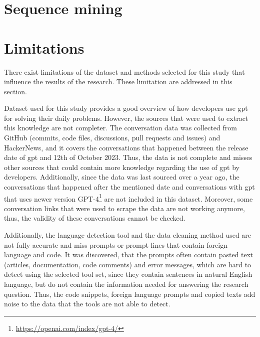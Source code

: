 \section{Sequence mining}

\section{Limitations}
There exist limitations of the dataset and methods selected for this study that influence the results of the research. These limitation are addressed in this section. 

Dataset used for this study provides a good overview of how developers use \acrshort{gpt} for solving their daily problems. However, the sources that were used to extract this knowledge are not completer. The conversation data was collected from GitHub (commits, code files, discussions, pull requests and issues) and HackerNews, and it covers the conversations that happened between the release date of \acrshort{gpt} and 12th of October 2023. Thus, the data is not complete and misses other sources that could contain more knowledge regarding the use of \acrshort{gpt} by developers. Additionally, since the data was last sourced over a year ago, the conversations that happened after the mentioned date and conversations with \acrshort{gpt} that uses newer version GPT-4\footnote{\url{https://openai.com/index/gpt-4/}} are not included in this dataset. Moreover, some conversation links that were used to scrape the data are not working anymore, thus, the validity of these conversations cannot be checked.

Additionally, the language detection tool and the data cleaning method used are not fully accurate and miss prompts or prompt lines that contain foreign language and code. It was discovered, that the prompts often contain pasted text (articles, documentation, code comments) and error messages, which are hard to detect using the selected tool set, since they contain sentences in natural English language, but do not contain the information needed for answering the research question. Thus, the code snippets, foreign language prompts and copied texts add noise to the data that the tools are not able to detect.